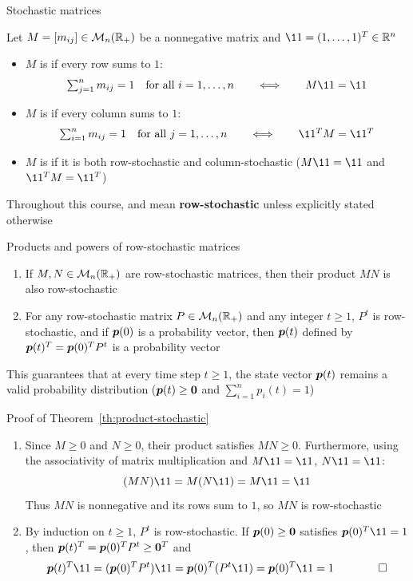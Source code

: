 \documentclass[aspectratio=169]{beamer}\usepackage[]{graphicx}\usepackage[]{xcolor}
\begin{document}
\begin{frame}{Stochastic matrices}
\begin{importantdefinition}
Let $M = [m_{ij}] \in \mathcal{M}_n(\mathbb{R}_+)$ be a nonnegative matrix and $\11 = (1, \ldots, 1)^T \in \IR^n$
\begin{itemize}
\item $M$ is  if every row sums to $1$:
\[
\textstyle \sum_{j=1}^n m_{ij} = 1 \quad \text{for all } i = 1, \ldots, n \qquad \Longleftrightarrow \qquad M\11 = \11
\]
\item $M$ is  if every column sums to $1$:
\[
\textstyle \sum_{i=1}^n m_{ij} = 1 \quad \text{for all } j = 1, \ldots, n \qquad \Longleftrightarrow \qquad \11^T M = \11^T
\]
\item $M$ is  if it is both row-stochastic and column-stochastic ($M\11 = \11$ and $\11^T M = \11^T$)
\end{itemize}
\end{importantdefinition}
\vfill
Throughout this course,  and  mean \textbf{row-stochastic} unless explicitly stated otherwise
\end{frame}

\begin{frame}{Products and powers of row-stochastic matrices}
\begin{theorem}
\label{th:product-stochastic}
\begin{enumerate}
\item If $M, N \in \mathcal{M}_n(\mathbb{R}_+)$ are row-stochastic matrices, then their product $MN$ is also row-stochastic
\item For any row-stochastic matrix $P \in \mathcal{M}_n(\mathbb{R}_+)$ and any integer $t \ge 1$, $P^t$ is row-stochastic, and if $\bm{p}(0)$ is a probability vector, then $\bm{p}(t)$ defined by $\bm{p}(t)^T = \bm{p}(0)^T P^t$ is a probability vector
\end{enumerate}
\end{theorem}
\vfill
This guarantees that at every time step $t \ge 1$, the state vector $\bm{p}(t)$ remains a valid probability distribution ($\bp(t) \ge \b0$ and $\sum_{i=1}^n p_i(t) = 1$)
\end{frame}

\begin{frame}{Proof of Theorem~\ref{th:product-stochastic}}
\begin{enumerate}
\item Since $M \ge 0$ and $N \ge 0$, their product satisfies $MN \ge 0$. Furthermore, using the associativity of matrix multiplication and $M\11 = \11$, $N\11 = \11$:
\[
(MN)\11 = M(N\11) = M\11 = \11
\]
Thus $MN$ is nonnegative and its rows sum to $1$, so $MN$ is row-stochastic
\vfill
\item By induction on $t \ge 1$, $P^t$ is row-stochastic. If $\bp(0) \ge \b0$ satisfies $\bp(0)^T\11 = 1$, then $\bp(t)^T = \bp(0)^T P^t \ge \b0^T$ and
\[
\bp(t)^T \11 = (\bp(0)^T P^t)\11 = \bp(0)^T (P^t \11) = \bp(0)^T \11 = 1 \qquad \qed
\]
\end{enumerate}
\end{frame}
\end{document}

